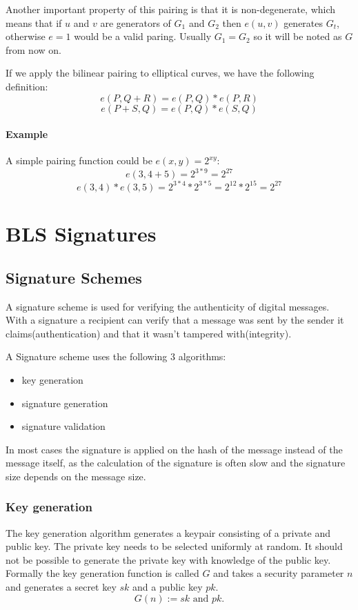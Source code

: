 \documentclass[a4paper,12pt]{scrartcl}
\begin{document}
Another important property of this pairing is that it is non-degenerate, which means that if $u$ and $v$ are generators of $G_1$ and $G_2$ then $e(u,v)$ generates $G_t$, otherwise $e = 1$ would be a valid paring.
Usually $G_1 = G_2$ so it will be noted as $G$ from now on.

If we apply the bilinear pairing to elliptical curves, we have the following definition:
$$e(P, Q + R) = e(P, Q) * e(P, R)$$
$$e(P + S, Q) = e(P, Q) * e(S, Q)$$

\paragraph{Example}
A simple pairing function could be $e(x, y) = 2^{xy}$:
$$e(3, 4 + 5) = 2^{3*9} = 2^{27}$$
$$e(3, 4) * e(3, 5) = 2^{3*4} * 2^{3*5} = 2^{12} * 2^{15} = 2^{27}$$

\pagebreak

\section{BLS Signatures}
\subsection{Signature Schemes}

A signature scheme is used for verifying the authenticity of digital messages. With a signature a recipient can verify that a message was sent by the sender it claims(authentication) and that it wasn't tampered with(integrity).

A Signature scheme uses the following 3 algorithms:
\begin{itemize}
	\item key generation
	\item signature generation
	\item signature validation
\end{itemize}

In most cases the signature is applied on the hash of the message instead of the message itself, as the calculation of the signature is often slow and the signature size depends on the message size. 

\subsubsection{Key generation}

The key generation algorithm generates a keypair consisting of a private and public key. The private key needs to be selected uniformly at random. It should not be possible to generate the private key with knowledge of the public key. Formally the key generation function is called $G$ and takes a security parameter $n$ and generates a secret key $sk$ and a public key $pk$.
\[
G(n) := sk \text{ and } pk.
\]
\end{document}
